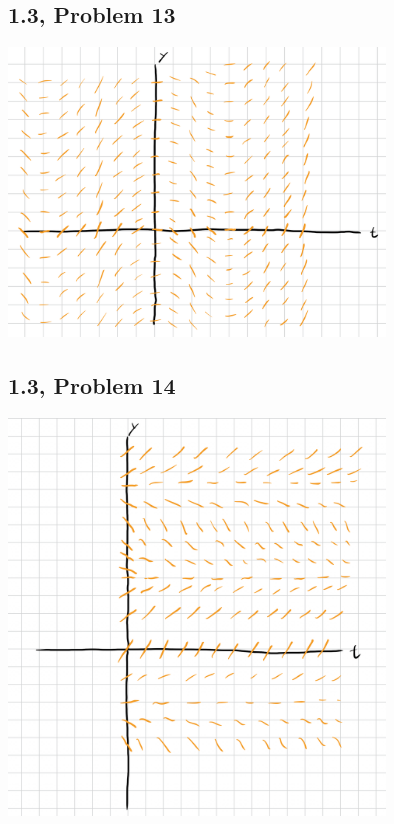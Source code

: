 \documentclass[12pt]{mypackage}
\begin{document}
\subsection{1.3, Problem 13}%
\begin{center}
  \includegraphics[width=10cm]{images/1_3_13.png}
\end{center}
\subsection{1.3, Problem 14}%
\begin{center}
  \includegraphics[width=10cm]{images/1_3_14.png}
\end{center}
\end{document}
